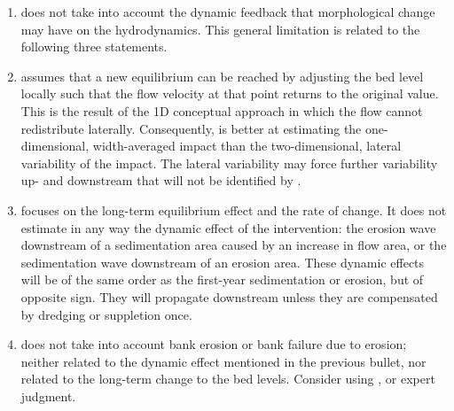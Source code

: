 \begin{enumerate}
\item \dfastmi does not take into account the dynamic feedback that morphological change may have on the hydrodynamics.
This general limitation is related to the following three statements.

\item \dfastmi assumes that a new equilibrium can be reached by adjusting the bed level locally such that the flow velocity at that point returns to the original value.
This is the result of the 1D conceptual approach in which the flow cannot redistribute laterally.
Consequently, \dfmi is better at estimating the one-dimensional, width-averaged impact than the two-dimensional, lateral variability of the impact.
The lateral variability may force further variability up- and downstream that will not be identified by \dfmi.

\item \dfastmi focuses on the long-term equilibrium effect and the rate of change.
It does not estimate in any way the dynamic effect of the intervention: the erosion wave downstream of a sedimentation area caused by an increase in flow area, or the sedimentation wave downstream of an erosion area.
These dynamic effects will be of the same order as the first-year sedimentation or erosion, but of opposite sign.
They will propagate downstream unless they are compensated by dredging or suppletion once.

\item \dfastmi does not take into account bank erosion or bank failure due to erosion; neither related to the dynamic effect mentioned in the previous bullet, nor related to the long-term change to the bed levels.
Consider using \dfastbe, or expert judgment.

\end{enumerate}
